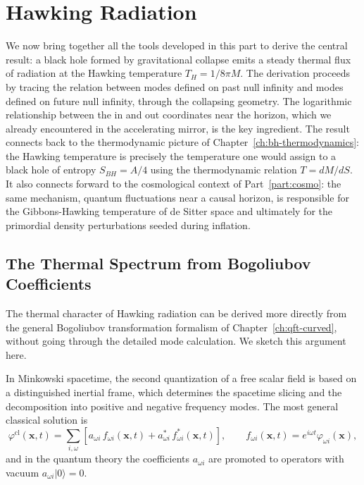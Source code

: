 \chapter{Hawking Radiation}
\label{ch:hawking-radiation}
We now bring together all the tools developed in this part to derive
the central result: a black hole formed by gravitational collapse emits
a steady thermal flux of radiation at the Hawking temperature
$T_H = 1/8\pi M$. The derivation proceeds by tracing the relation
between modes defined on past null infinity and modes defined on future
null infinity, through the collapsing geometry. The logarithmic
relationship between the in and out coordinates near the horizon, which
we already encountered in the accelerating mirror, is the key
ingredient. The result connects back to the thermodynamic picture of
Chapter~\ref{ch:bh-thermodynamics}: the Hawking temperature is
precisely the temperature one would assign to a black hole of entropy
$S_{BH} = A/4$ using the thermodynamic relation $T = dM/dS$. It also
connects forward to the cosmological context of Part~\ref{part:cosmo}:
the same mechanism, quantum fluctuations near a causal horizon, is
responsible for the Gibbons-Hawking temperature of de Sitter space and
ultimately for the primordial density perturbations seeded during
inflation.

\section{The Thermal Spectrum from Bogoliubov Coefficients}

The thermal character of Hawking radiation can be derived more directly
from the general Bogoliubov transformation formalism of
Chapter~\ref{ch:qft-curved}, without going through the detailed mode
calculation. We sketch this argument here.

In Minkowski spacetime, the second quantization of a free scalar field
is based on a distinguished inertial frame, which determines the
spacetime slicing and the decomposition into positive and negative
frequency modes. The most general classical solution is
\begin{equation}
    \varphi^{\text{cl}}(\mathbf{x},t)
    = \sum_{i,\omega}\left[a_{\omega i}\,f_{\omega i}(\mathbf{x},t)
    + a_{\omega i}^*\,f_{\omega i}^*(\mathbf{x},t)\right],
    \qquad
    f_{\omega i}(\mathbf{x},t) = e^{i\omega t}\varphi_{\omega i}(\mathbf{x}),
\end{equation}
and in the quantum theory the coefficients $a_{\omega i}$ are promoted
to operators with vacuum $a_{\omega i}|0\rangle = 0$.

